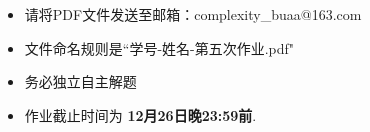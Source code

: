 \documentclass[11pt,addpoints,answers]{exam}
\newcommand{\duedate}{12月26日晚23:59前} %
\begin{document}
\pagestyle{head}                %

\pagestyle{head}                %

\begin{itemize}
	\item 请将PDF文件发送至邮箱：complexity\_buaa@163.com
	\item 文件命名规则是``学号-姓名-第五次作业.pdf"
	\item 务必独立自主解题
	\item 作业截止时间为 \textbf{\duedate}.
\end{itemize}

\medskip


 

\end{document}
